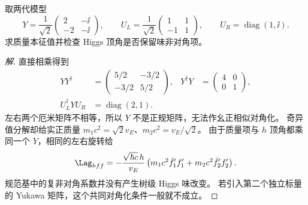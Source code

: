 \begin{example}
取两代模型
\begin{equation*}
Y=\frac1{\sqrt2}\begin{pmatrix}2&-\ii\\-2&-\ii\end{pmatrix},\qquad
U_L=\frac1{\sqrt2}\begin{pmatrix}1&1\\-1&1\end{pmatrix},\qquad
U_R=\operatorname{diag}(1,\ii).
\end{equation*}
求质量本征值并检查 Higgs 顶角是否保留味非对角项。
\end{example}
\begin{proof}[解]
直接相乘得到
\begin{align*}
YY^\dagger&=\begin{pmatrix}5/2&-3/2\\-3/2&5/2\end{pmatrix},
&Y^\dagger Y&=\begin{pmatrix}4&0\\0&1\end{pmatrix},\\
U_L^\dagger YU_R&=\operatorname{diag}(2,1).
\end{align*}
左右两个厄米矩阵不相等，所以 $Y$ 不是正规矩阵，无法作幺正相似对角化。
奇异值分解却给实正质量 $m_1c^2=\sqrt2v_E$、$m_2c^2=v_E/\sqrt2$。
由于质量项与 $h$ 顶角都乘同一个 $Y$，相同的左右旋转给
\begin{equation*}
\Lag_{hff}=-\frac{\sqrt{\hbar c}\,h}{v_E}
\left(m_1c^2\bar f_1'f_1'+m_2c^2\bar f_2'f_2'\right).
\end{equation*}
规范基中的复非对角系数并没有产生树级 Higgs 味改变。
若引入第二个独立标量的 Yukawa 矩阵，这个共同对角化条件一般就不成立。
\end{proof}
